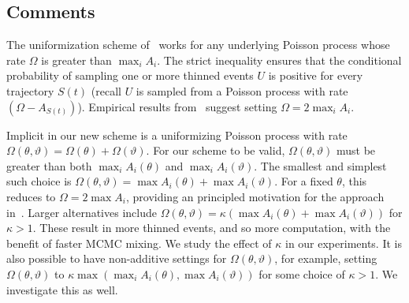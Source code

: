 \subsection{Comments}\label{sec:comments}

The uniformization scheme of~\cite{RaoTeh13} works for any underlying Poisson
process whose rate $\Omega$ is greater than $\max_i A_i$. The strict inequality
ensures that the conditional probability of sampling one or more thinned events 
$U$ is positive for every trajectory $S(t)$ (recall $U$ is sampled from a Poisson process with rate $(\Omega-A_{S(t)})$). Empirical results from~\cite{RaoTeh13}
suggest setting $\Omega = 2 \max_i A_i$.

Implicit in our new scheme is a uniformizing Poisson process with rate
$\Omega(\theta,\vartheta) = \Omega(\theta) + \Omega(\vartheta)$. For our 
scheme to be valid, $\Omega(\theta,\vartheta)$ must be greater than both
$\max_i A_i(\theta)$ and $\max_i A_i(\vartheta)$. The smallest and simplest such
choice is $\Omega(\theta,\vartheta) = \max A_i(\theta) + \max A_i(\vartheta)$.
For a fixed $\theta$, this reduces to $\Omega = 2\max A_i$, providing
an principled motivation for the approach in~\cite{RaoTeh13}.
Larger alternatives include 
$\Omega(\theta,\vartheta) = \kappa(\max A_i(\theta) + \max A_i(\vartheta))$
for $\kappa > 1$.  These result in more thinned events, and so more 
computation, with the benefit of faster MCMC mixing. We study the effect of 
$\kappa$ in our experiments.
It is also possible to have non-additive settings for $\Omega(\theta,\vartheta)$,
for example, setting $\Omega(\theta,\vartheta)$ to 
$\kappa \max( \max_i A_i(\theta), \max A_i(\vartheta))$ for some choice of $\kappa
> 1$. We investigate this as well.

